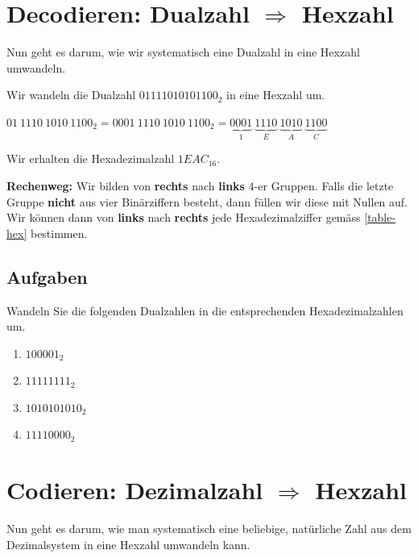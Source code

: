 \section{Decodieren: Dualzahl $\Rightarrow$ Hexzahl}

Nun geht es darum, wie wir systematisch eine Dualzahl in eine Hexzahl umwandeln.

\begin{example}

Wir wandeln die Dualzahl $01111010101100_{2}$ in eine Hexzahl um.

\begin{center}
$01~1110~1010~1100_{2} = 0001~1110~1010~1100_{2} = \underbrace{0001}_{1}~\underbrace{1110}_{E}~\underbrace{1010}_{A}~\underbrace{1100}_{C}$
\end{center}

Wir erhalten die Hexadezimalzahl $1EAC_{16}$.

\end{example}

\textbf{Rechenweg:} Wir bilden von \textbf{rechts} nach \textbf{links} $4$-er Gruppen. Falls die letzte Gruppe \textbf{nicht} aus vier Binärziffern besteht, dann füllen wir diese mit Nullen auf. Wir können dann von \textbf{links} nach \textbf{rechts} jede Hexadezimalziffer gemäss \autoref{table-hex} bestimmen.

\subsection{Aufgaben}
\label{subsection-dual2hex-aufgaben}

Wandeln Sie die folgenden Dualzahlen in die entsprechenden Hexadezimalzahlen um.

\begin{enumerate}
\item $100001_{2}$
\fillwithgrid{0.25in}
\item $11111111_{2}$
\fillwithgrid{0.25in}
\item $1010101010_{2}$
\fillwithgrid{0.25in}
\item $11110000_{2}$
\fillwithgrid{0.25in}
\end{enumerate}

\section{Codieren: Dezimalzahl $\Rightarrow$ Hexzahl}

Nun geht es darum, wie man systematisch eine beliebige, natürliche Zahl aus dem Dezimalsystem in eine Hexzahl umwandeln kann.

